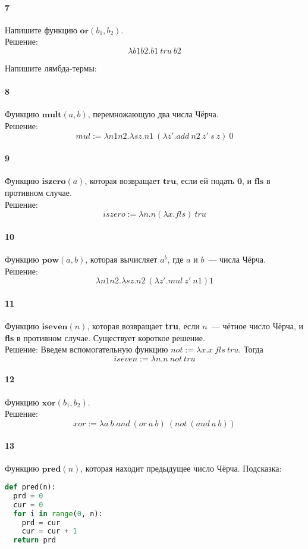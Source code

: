 \documentclass[12pt, a4paper] {article}
\begin{document}
\paragraph{7} Напишите функцию $\textbf{or}(b_1, b_2)$. \\
Решение: $$ \lambda b1b2. b1\ tru \ b2 $$

Напишите лямбда-термы:
  \paragraph{8} Функцию $\mathbf{mult}(a, b)$, перемножающую два числа Чёрча. \\
  Решение: 
  $$ mul := \lambda n1 n2. \lambda sz. n1\ (\lambda z'. add\ n2\ z'\ s\ z)\ 0 $$
  \paragraph{9} Функцию $\mathbf{iszero}(a)$, которая возвращает $\textbf{tru}$, если
    ей подать $\mathbf{0}$, и $\textbf{fls}$ в противном случае. \\
   Решение:
   $$ iszero := \lambda n. n (\lambda x.fls)\ tru  $$
  \paragraph{10} Функцию $\mathbf{pow}(a, b)$, которая вычисляет $a^b$, где $a$ и $b$~---
    числа Чёрча.\\
    Решение:
    $$ \lambda n1n2. \lambda sz. n2\ (\lambda z'. mul\ z'\ n1) 1   $$
  \paragraph{11} Функцию $\mathbf{iseven}(n)$, которая возвращает \textbf{tru}, если
    $n$~--- чётное число Чёрча, и \textbf{fls} в противном случае. Существует
    короткое решение. \\
    Решение:
    Введем вспомогательную функцию $ not := \lambda x. x\ fls\ tru $. Тогда  
    $$ iseven := \lambda n. n\ not\ tru $$
  \paragraph{12} Функцию $\mathbf{xor}(b_1, b_2)$.\\
  Решение:
 $$ xor := \lambda a\ b. and\ (or\ a\ b)\ (not\ (and\ a\ b)) $$
  \paragraph{13} Функцию $\mathbf{pred}(n)$, которая находит предыдущее число Чёрча.
    Подсказка:
\begin{lstlisting}[language=Python]
def pred(n):
  prd = 0
  cur = 0
  for i in range(0, n):
    prd = cur
    cur = cur + 1
  return prd
\end{lstlisting}
\end{document}
